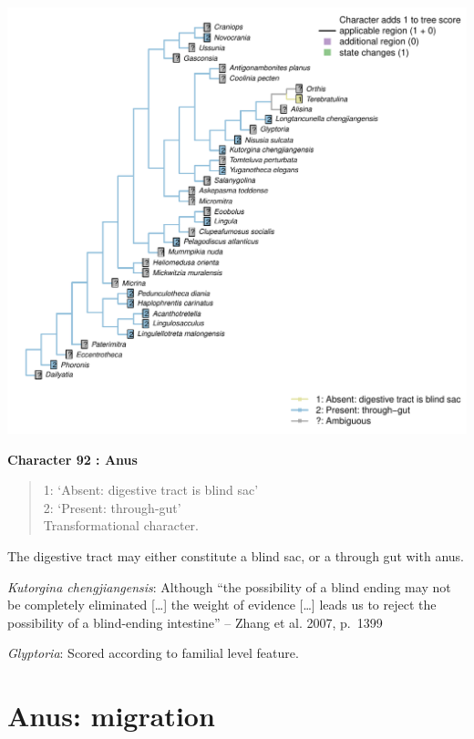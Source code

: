 \documentclass[]{book}
\theoremstyle{definition}
\theoremstyle{definition}
\theoremstyle{definition}
\theoremstyle{remark}
\begin{document}
\includegraphics{Brachiopod_phylogeny_files/figure-latex/unnamed-chunk-5-92.pdf}

\textbf{Character 92 : Anus }

\begin{quote}
1: `Absent: digestive tract is blind sac'\\
2: `Present: through-gut'\\
Transformational character.
\end{quote}

The digestive tract may either constitute a blind sac, or a through gut
with anus.

\emph{Kutorgina chengjiangensis}: Although ``the possibility of a blind
ending may not be completely eliminated {[}\ldots{}{]} the weight of
evidence {[}\ldots{}{]} leads us to reject the possibility of a
blind-ending intestine'' -- Zhang et al. 2007, p.~1399

\emph{Glyptoria}: Scored according to familial level feature.

\hypertarget{anus-migration}{%
\section*{Anus: migration}\label{anus-migration}}
\end{document}
